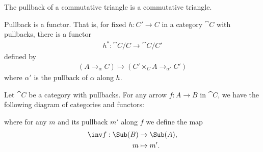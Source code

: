 \documentclass{article}
\begin{document}
\begin{corollary}[Awodey p. 96]
    The pullback of a commutative triangle is a commutative triangle.

    \begin{center}
    \end{center}
\end{corollary}

\begin{proposition}
    Pullback is a functor. That is, for fixed $h:C'\to C$ in a category $\cat C$ with pullbacks,
    there is a functor
    \begin{align*}
        h^*:\cat C/C \to \cat C/C'
    \end{align*}
    defined by
    \begin{align*}
        (A\to_\alpha C)\mapsto (C'\times_C A\to_{\alpha'}C')
    \end{align*}
    where $\alpha'$ is the pullback of $\alpha$ along $h$.
\end{proposition}

\begin{corollary}[Awodey p. 97]
    Let $\cat C$ be a category with pullbacks. For any arrow $f:A\to B$
    in $\cat C$, we have the following diagram of categories and functors:
    \begin{center}
    \end{center}
    where for any $m$ and its pullback $m'$ along $f$ we define
    the map
    \begin{align*}
        \inv f: \Sub(B)&\to\Sub(A),\\
        m &\mapsto m'.
    \end{align*}
\end{corollary}
\end{document}
